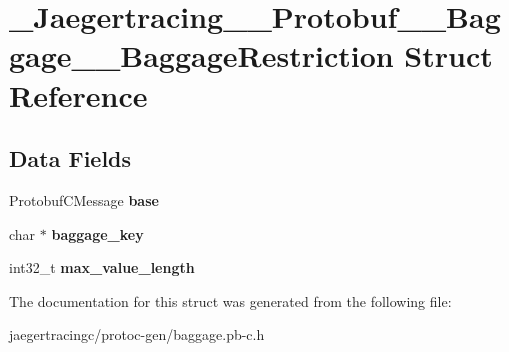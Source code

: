 \hypertarget{struct__Jaegertracing____Protobuf____Baggage____BaggageRestriction}{}\section{\+\_\+\+Jaegertracing\+\_\+\+\_\+\+Protobuf\+\_\+\+\_\+\+Baggage\+\_\+\+\_\+\+Baggage\+Restriction Struct Reference}
\label{struct__Jaegertracing____Protobuf____Baggage____BaggageRestriction}
\subsection*{Data Fields}
\begin{DoxyCompactItemize}
\item 
\mbox{\label{struct__Jaegertracing____Protobuf____Baggage____BaggageRestriction_a886145f39783ca576cfdecf72d7c9afd}} 
Protobuf\+C\+Message {\bfseries base}
\item 
\mbox{\label{struct__Jaegertracing____Protobuf____Baggage____BaggageRestriction_a9691e91e7da087196209f5439fcb51ce}} 
char $\ast$ {\bfseries baggage\+\_\+key}
\item 
\mbox{\label{struct__Jaegertracing____Protobuf____Baggage____BaggageRestriction_a7bdf956c56b49a1d2432d536032f0075}} 
int32\+\_\+t {\bfseries max\+\_\+value\+\_\+length}
\end{DoxyCompactItemize}


The documentation for this struct was generated from the following file\+:\begin{DoxyCompactItemize}
\item 
jaegertracingc/protoc-\/gen/baggage.\+pb-\/c.\+h\end{DoxyCompactItemize}
